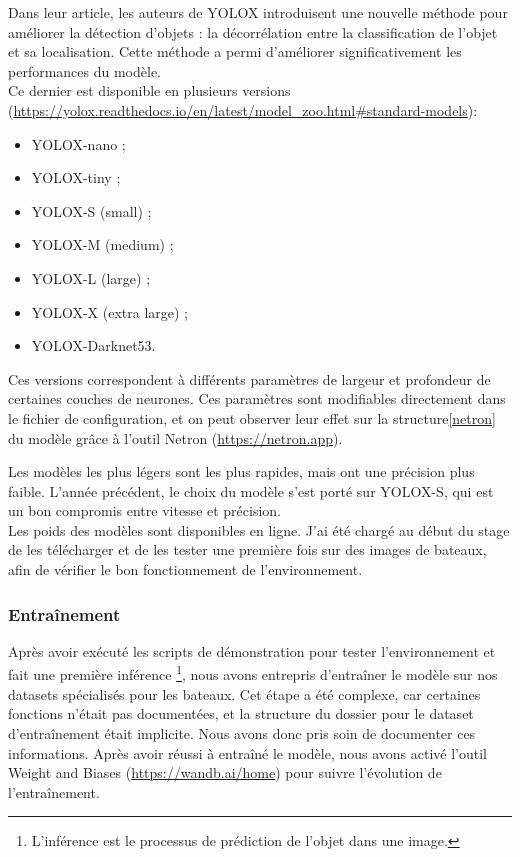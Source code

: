 Dans leur article, les auteurs de YOLOX \cite{Ge_Liu_Wang_Li_Sun_2021} introduisent une nouvelle méthode
pour améliorer la détection d'objets : la décorrélation entre la classification de l'objet et
sa localisation. Cette méthode a permi d'améliorer significativement les performances du modèle.\\

Ce dernier est disponible en plusieurs versions (\url{https://yolox.readthedocs.io/en/latest/model_zoo.html#standard-models}):
\begin{itemize}
    \item YOLOX-nano ;
    \item YOLOX-tiny ;
    \item YOLOX-S (small) ;
    \item YOLOX-M (medium) ;
    \item YOLOX-L (large) ;
    \item YOLOX-X (extra large) ;
    \item YOLOX-Darknet53.
\end{itemize}

Ces versions correspondent à différents paramètres de largeur et profondeur de certaines couches de neurones.
Ces paramètres sont modifiables directement dans le fichier de configuration,
et on peut observer leur effet sur la structure\ref{netron} du modèle grâce à l'outil Netron
(\url{https://netron.app}).

Les modèles les plus légers sont les plus rapides, mais ont une précision plus faible.
L'année précédent, le choix du modèle s'est porté sur YOLOX-S, qui est un bon compromis entre
vitesse et précision.\\

Les poids des modèles sont disponibles en ligne. J'ai été chargé au début du stage de les
télécharger et de les tester une première fois sur des images de bateaux, afin de vérifier
le bon fonctionnement de l'environnement.\\

\subsubsection{Entraînement}

Après avoir exécuté les scripts de démonstration pour tester l'environnement
et fait une première inférence \footnote{L'inférence est le processus de prédiction
de l'objet dans une image.}, nous avons entrepris d'entraîner le modèle sur nos datasets spécialisés pour
les bateaux. Cet étape a été complexe, car certaines fonctions n'était pas documentées, et
la structure du dossier pour le dataset d'entraînement était implicite. Nous avons donc pris soin de documenter
ces informations. Après avoir réussi à entraîné le modèle, nous avons activé l'outil
Weight and Biases (\url{https://wandb.ai/home}) pour suivre l'évolution de l'entraînement.\\

